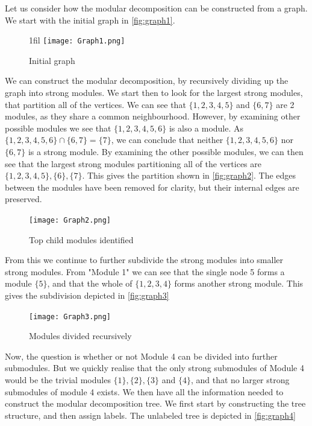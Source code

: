 \documentclass[a4paper]{article}
\makeatletter
\newcommand*{\centerfloat}{%
  \parindent \z@
  \leftskip \z@ \@plus 1fil \@minus \textwidth
  \rightskip\leftskip
  \parfillskip \z@skip}
\makeatother
\begin{document}
Let us consider how the modular decomposition can be constructed from a graph. 
We start with the initial graph in \autoref{fig:graph1}.

\begin{figure}[H]
    \centerfloat
    \texttt{[image: Graph1.png]}
    \caption{Initial graph}
    \label{fig:graph1}
\end{figure}

We can construct the modular decomposition, by recursively dividing up the graph
into strong modules. We start then to look for the largest strong modules, that
partition all of the vertices. We can see that $\{1,2,3,4,5\}$ and $\{6,7\}$ are
2 modules, as they share a common neighbourhood.  However, by examining other
possible modules we see that $\{1,2,3,4,5,6\}$ is also a module. As 
$\{1,2,3,4,5,6\} \cap \{6,7\} = \{7\}$, we can conclude that neither 
$\{1,2,3,4,5,6\}$ nor $\{6,7\}$ is a strong module. By examining the other
possible modules, we can then see that the largest strong modules partitioning all of 
the vertices are $\{1,2,3,4,5\},\{6\},\{7\}$. This gives
the partition shown in \autoref{fig:graph2}. The edges between the modules have
been removed for clarity, but their internal edges are preserved.

\begin{figure}[H]
    \texttt{[image: Graph2.png]}
    \caption{Top child modules identified}
    \label{fig:graph2}
\end{figure}

From this we continue to further subdivide the strong modules into smaller
strong modules. From "Module 1" we can see that the single node 5 forms a
module $\{5\}$, and that the whole of $\{1,2,3,4\}$ forms another strong module.  This
gives the subdivision depicted in \autoref{fig:graph3}

\begin{figure}[H]
    \texttt{[image: Graph3.png]}
    \caption{Modules divided recursively}
    \label{fig:graph3}
\end{figure}

Now, the question is whether or not Module 4 can be divided into further
submodules. But we quickly realise that the only strong submodules of Module 4
would be the trivial modules $\{1\},\{2\},\{3\}$ and $\{4\}$, and that no larger strong submodules
of module 4 exists. We then have all the information needed to construct the
modular decomposition tree. We first start by constructing the tree structure,
and then assign labels. The unlabeled tree is depicted in \autoref{fig:graph4}
\end{document}
